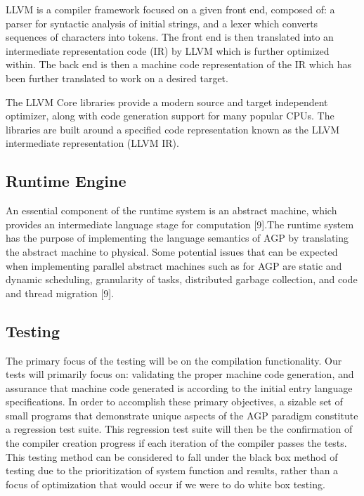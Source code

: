 \documentclass[11pt]{article}
\begin{document}
LLVM is a compiler framework focused on a given front end, composed of: a parser for syntactic analysis of initial strings,  and a lexer which converts sequences of characters into tokens. The front end is then translated into an intermediate representation code (IR) by LLVM which is further optimized within. The back end is then a machine code representation of the IR which has been further translated to work on a desired target.

The LLVM Core libraries provide a modern source and target independent optimizer, along with code generation support for many popular CPUs. The libraries are built around a specified code representation known as the LLVM intermediate representation (LLVM IR).


\subsection{Runtime Engine}

An essential component of the runtime system is an abstract machine, which provides an intermediate language stage for computation [9].The runtime system has the purpose of implementing the language semantics of AGP by translating the abstract machine to physical. Some potential issues that can be expected when implementing parallel abstract machines such as for AGP are static and dynamic scheduling, granularity of tasks, distributed garbage collection, and code and thread migration [9].

\subsection{Testing}

The primary focus of the testing will be on the compilation functionality. Our tests will primarily focus on: validating the proper machine code generation, and assurance that machine code generated is according to the initial entry language specifications. In order to accomplish these primary objectives, a sizable set of small programs that demonstrate unique aspects of the AGP paradigm constitute a regression test suite. This regression test suite will then be the confirmation of the compiler creation progress if each iteration of the compiler passes the tests.
This testing method can be considered to fall under the black box method of testing due to the prioritization of system function and results, rather than a focus of optimization that would occur if we were to do white box testing.
\end{document}
